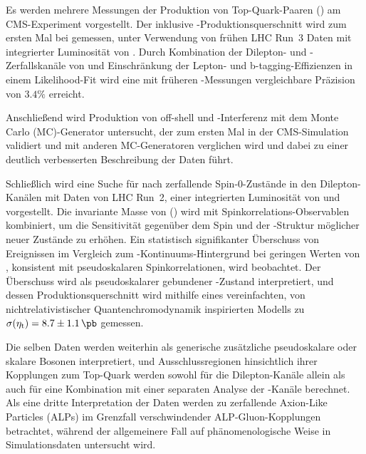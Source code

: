 Es werden mehrere Messungen der Produktion von Top-Quark-Paaren (\ttbar) am CMS-Experiment vorgestellt. Der inklusive \ttbar-Produktionsquerschnitt \sigmatt wird zum ersten Mal bei \sqrtsRIII gemessen, unter Verwendung von fr{\"u}hen LHC Run~3 Daten mit integrierter Luminosit{\"a}t von \lumiRIII. Durch Kombination der Dilepton- und \ljets-Zerfallskan{\"a}le von \ttbar und Einschr{\"a}nkung der Lepton- und b-tagging-Effizienzen in einem Likelihood-Fit wird eine mit fr{\"u}heren \sigmatt-Messungen vergleichbare Pr{\"a}zision von $3.4\%$ erreicht.

Anschließend wird Produktion von off-shell \ttbar und \tttW-Interferenz mit dem Monte Carlo (MC)-Generator \bbfourl untersucht, der zum ersten Mal in der CMS-Simulation validiert und mit anderen MC-Generatoren verglichen wird und dabei zu einer deutlich verbesserten Beschreibung der Daten f{\"u}hrt.

Schlie{\ss}lich wird eine Suche f{\"ur} nach \ttbar zerfallende Spin-0-Zust{\"a}nde in den Dilepton-Kan{\"a}len mit Daten von LHC Run~2, einer integrierten Luminosit{\"a}t von \lumiRII und \sqrtsRII vorgestellt. Die invariante Masse von \ttbar (\mtt) wird mit Spinkorrelations-Observablen kombiniert, um die Sensitivit{\"at} gegen{\"u}ber dem Spin und der \CP-Struktur m{\"o}glicher neuer Zust{\"a}nde zu erh{\"o}hen. Ein statistisch signifikanter {\"U}berschuss von Ereignissen im Vergleich zum \ttbar-Kontinuums-Hintergrund bei geringen Werten von \mtt, konsistent mit pseudoskalaren Spinkorrelationen, wird beobachtet. Der {\"U}berschuss wird als pseudoskalarer gebundener \ttbar-Zustand \etat interpretiert, und dessen Produktionsquerschnitt wird mithilfe eines vereinfachten, von nichtrelativistischer Quantenchromodynamik inspirierten Modells zu $\sigetat =  8.7 \pm 1.1  \, \si{\pb}$ gemessen.

Die selben Daten werden weiterhin als generische zus{\"a}tzliche pseudoskalare oder skalare Bosonen interpretiert, und Ausschlussregionen 
hinsichtlich ihrer Kopplungen zum Top-Quark werden sowohl f{\"u}r die Dilepton-Kan{\"a}le allein als auch f{\"u}r eine Kombination mit einer separaten Analyse der \ljets-Kan{\"a}le berechnet. Als eine dritte Interpretation der Daten werden zu \ttbar zerfallende Axion-Like Particles (ALPs) im Grenzfall verschwindender ALP-Gluon-Kopplungen betrachtet, w{\"a}hrend der allgemeinere Fall auf ph{\"a}nomenologische Weise in Simulationsdaten untersucht wird.

